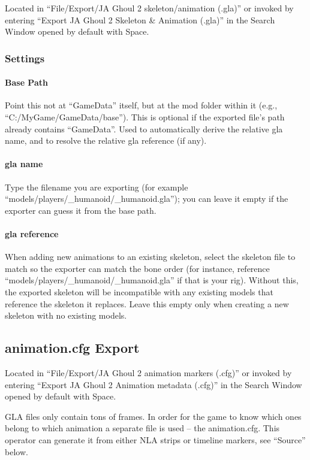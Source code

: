 \documentclass[a4paper,10pt]{article}
\begin{document}
 Located in ``File/Export/JA Ghoul 2 skeleton/animation (.gla)'' or invoked by entering ``Export JA Ghoul 2 
 Skeleton \& Animation (.gla)'' in the Search Window opened by default with Space.
 
 \subsubsection*{Settings}
 
\paragraph*{Base Path}
Point this not at ``GameData'' itself, but at the mod folder within it (e.g., ``C:/MyGame/GameData/base'').
This is optional if the exported file's path already contains ``GameData''. Used to automatically derive
the relative gla name, and to resolve the relative gla reference (if any).

\paragraph*{gla name}
Type the filename you are exporting (for example ``models/players/\_humanoid/\_humanoid.gla''); you can leave it
empty if the exporter can guess it from the base path.

\paragraph*{gla reference}
When adding new animations to an existing skeleton, select the skeleton file to match so the exporter can match
the bone order (for instance, reference ``models/players/\_humanoid/\_humanoid.gla'' if that is your rig).
Without this, the exported skeleton will be incompatible with any existing models that reference the skeleton
it replaces. Leave this empty only when creating a new skeleton with no existing models.
 
 
 \subsection{animation.cfg Export}
 
 Located in ``File/Export/JA Ghoul 2 animation markers (.cfg)'' or invoked by entering ``Export JA Ghoul 2 
 Animation metadata (.cfg)'' in the Search Window opened by default with Space.
 
 GLA files only contain tons of frames. In order for the game to know which ones belong to which animation
 a separate file is used -- the animation.cfg. This operator can generate it from either NLA strips or
 timeline markers, see ``Source'' below.
\end{document}
